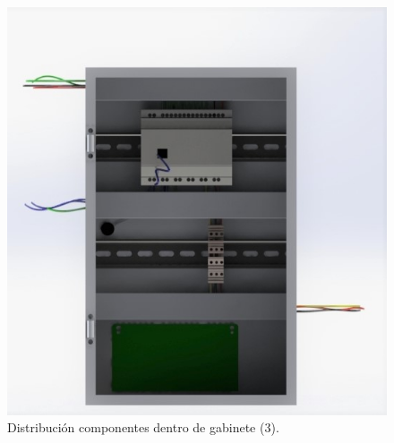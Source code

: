 \begin{figure}[H]
	\centering
	\includegraphics[scale=0.5]{imagenes/gabinete3.jpg}
	\caption{Distribución componentes dentro de gabinete (3).}
	\label{fig:gabinete3}
\end{figure}




\endinput 